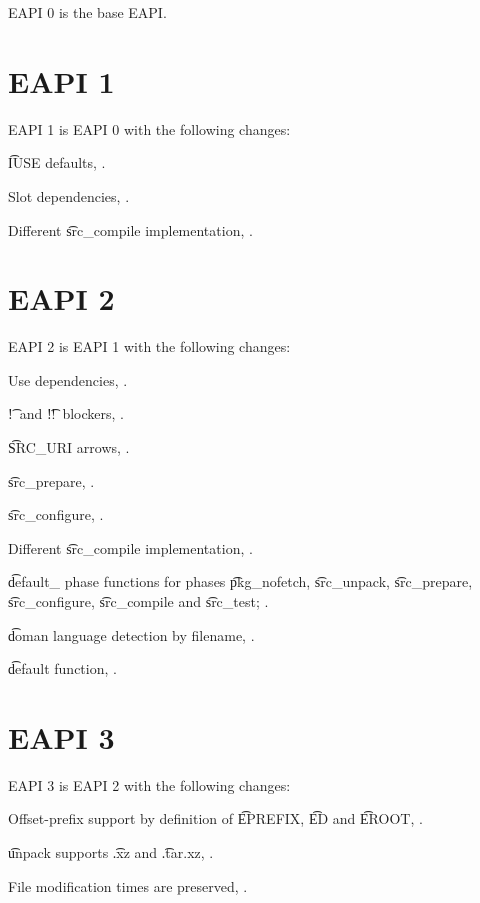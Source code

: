 EAPI 0 is the base EAPI.

\section{EAPI 1}

EAPI 1 is EAPI 0 with the following changes:

\begin{compactitem}
\item \t{IUSE} defaults, .
\item Slot dependencies, .
\item Different \t{src_compile} implementation, .
\end{compactitem}

\section{EAPI 2}

EAPI 2 is EAPI 1 with the following changes:

\begin{compactitem}
\item Use dependencies, .
\item \t{!}\ and \t{!!}\ blockers, .
\item \t{SRC_URI} arrows, .
\item \t{src_prepare}, .
\item \t{src_configure}, .
\item Different \t{src_compile} implementation, .
\item \t{default_} phase functions for phases \t{pkg_nofetch}, \t{src_unpack}, \t{src_prepare},
    \t{src_configure}, \t{src_compile} and \t{src_test}; .
\item \t{doman} language detection by filename, .
\item \t{default} function, .
\end{compactitem}

\section{EAPI 3}

EAPI 3 is EAPI 2 with the following changes:
\begin{compactitem}
\item Offset-prefix support by definition of \t{EPREFIX}, \t{ED} and \t{EROOT},
    .
\item \t{unpack} supports \t{.xz} and \t{.tar.xz}, .
\item File modification times are preserved, .
\end{compactitem}

